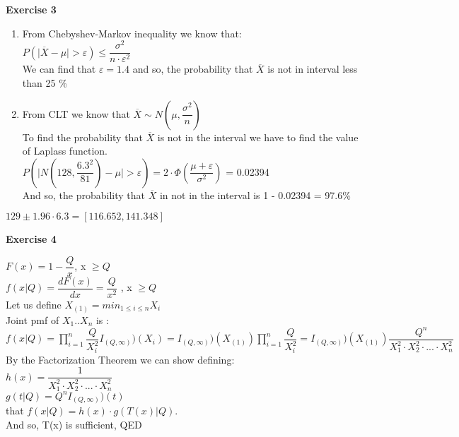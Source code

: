 \documentclass[12pt]{article}
\begin{document}
\textbf{Exercise 3}

\begin{list}{()~}{}
\item
\begin{enumerate}
\item
From Chebyshev-Markov inequality we know that:\\
$P\left( \vert \overline{X} - \mu \vert > \varepsilon \right) \leq \dfrac{\sigma^2}{n \cdot \varepsilon^2}$\\
We can find that $\varepsilon = 1.4$ and so, the probability that $\overline{X}$ is not in interval less than 25 \%
\item
From CLT we know that $\overline{X} \sim N\left( \mu, \dfrac{\sigma^2}{n} \right)$\\
To find the probability that $\overline{X}$ is not in the interval we have to find the value of Laplass function.\\
$P\left( \vert N(128, \dfrac{6.3^2}{81}) - \mu   \vert > \varepsilon \right) = 2 \cdot \Phi\left(\dfrac{\mu + \varepsilon}{\sigma^2}\right)$ = 0.02394\\
And so, the probability that $\overline{X}$ in not in the interval is 1 - 0.02394 = 97.6\%
\end{enumerate}
\item
$129 \pm 1.96 \cdot 6.3 = [116.652, 141.348] $
\end{list}
\medskip

\medskip		

\textbf{Exercise 4}

$F(x) = 1 - \dfrac{Q}{x}$, x $\geq Q$\\
$f(x \vert Q) = \dfrac{d F(x)}{dx} = \dfrac{Q}{x^2}$ ,  x $\geq Q$\\
Let us define $X_{(1)} = min_{1 \leq i \leq n}X_i$\\
Joint pmf of $X_1..X_n$ is :\\
$f(x \vert Q) = \prod^n_{i = 1} \dfrac{Q}{X^2_i} I_{(Q, \infty)})(X_i) = I_{(Q, \infty)})(X_{(1)}) \prod^n_{i = 1} \dfrac{Q}{X^2_i} = I_{(Q, \infty)})(X_{(1)}) \dfrac{Q^n}{X^2_1 \cdot X^2_2 \cdot ... \cdot X^2_n }$\\

By the Factorization Theorem we can show defining:\\
$h(x) = \dfrac{1}{X^2_1 \cdot X^2_2 \cdot ... \cdot X^2_n }$\\
$g(t | Q) = Q^n  I_{(Q, \infty)})(t)$\\
that  $f(x \vert Q) = h(x) \cdot g(T(x) | Q)$.\\
And so, T(x) is sufficient, QED
\medskip
\end{document}
